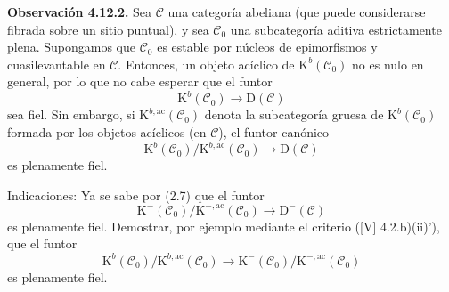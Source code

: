 
\providecommand{\sisi}[2]{#2}

\providecommand{\Cpx}{\mathrm C}
\providecommand{\Kpx}{\mathrm K}
\providecommand{\Dpx}{\mathrm D}
\providecommand{\Ho}{\mathrm H}
\providecommand{\RHom}{\mathrm R\!\operatorname{Hom}}
\providecommand{\Ob}{\operatorname{ob}}
\providecommand{\qis}{\xrightarrow{\sim}}
\providecommand{\RHom}{\mathrm R\!\Hom}
\providecommand{\Ext}{\operatorname{Ext}}
\providecommand{\Hom}{\operatorname{Hom}}
\providecommand{\Tr}{\operatorname{Tr}}

\providecommand{\Add}{\operatorname{Add}}
\providecommand{\Cart}{\operatorname{Cart}}
\providecommand{\perfamp}{\operatorname{perf.amp}}
\providecommand{\perfdim}{\operatorname{perf.dim}}
\providecommand{\toramp}{\operatorname{tor.amp}}
\providecommand{\torf}{\operatorname{torf}}
\providecommand{\injf}{\operatorname{injf}}
\providecommand{\rg}{\operatorname{rg}}
\providecommand{\is}{\mathrm{is}}
\providecommand{\Mod}{\operatorname{Mod}}


\textbf{Observación 4.12.2.} Sea \(\mathcal C\) una categoría abeliana (que puede considerarse fibrada sobre un sitio puntual), y sea \(\mathcal C_0\) una subcategoría aditiva estrictamente plena. Supongamos que \(\mathcal C_0\) es estable por núcleos de epimorfismos y cuasilevantable en \(\mathcal C\). Entonces, un objeto acíclico de \(\Kpx^b(\mathcal C_0)\) no es nulo en general, por lo que no cabe esperar que el funtor
\[
  \Kpx^b(\mathcal C_0)\longrightarrow \Dpx(\mathcal C)
\]
sea fiel. Sin embargo, si \(\Kpx^{b,\mathrm{ac}}(\mathcal C_0)\) denota la subcategoría gruesa de \(\Kpx^b(\mathcal C_0)\) formada por los objetos acíclicos (en \(\mathcal C\)), el funtor canónico
\[
  \Kpx^b(\mathcal C_0)/\Kpx^{b,\mathrm{ac}}(\mathcal C_0)
  \longrightarrow \Dpx(\mathcal C)
\]
es plenamente fiel.

Indicaciones: Ya se sabe por (2.7) que el funtor
\[
  \Kpx^-(\mathcal C_0)/\Kpx^{-,\mathrm{ac}}(\mathcal C_0)
  \longrightarrow \Dpx^-(\mathcal C)
\]
es plenamente fiel. Demostrar, por ejemplo mediante el criterio ([V] 4.2.b)(ii)'), que el funtor
\[
  \Kpx^b(\mathcal C_0)/\Kpx^{b,\mathrm{ac}}(\mathcal C_0)
  \longrightarrow
  \Kpx^-(\mathcal C_0)/\Kpx^{-,\mathrm{ac}}(\mathcal C_0)
\]
es plenamente fiel.

